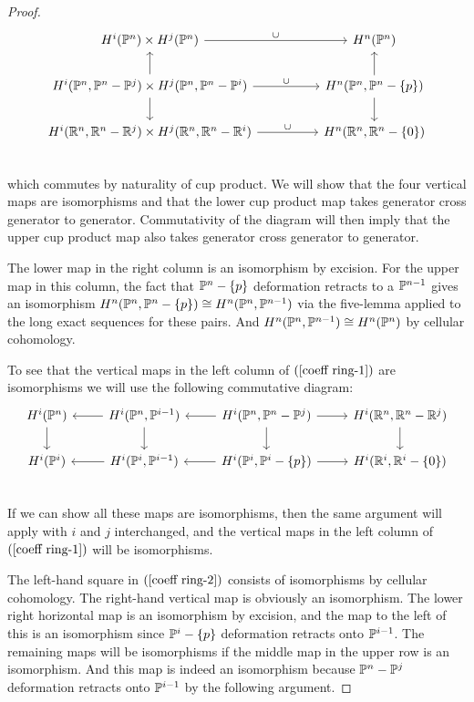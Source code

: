 \begin{proof}
\begin{equation}
\begin{tikzcd}
H^i(\P^n)\times H^j(\P^n)\ar[rr,"\cup"]&&H^n(\P^n)\\
H^i(\P^n,\P^n-\P^j)\times H^j(\P^n,\P^n-\P^i)\ar[rr,"\cup"]\ar[u]\ar[d]&&H^n(\P^n,\P^n-\{p\})\ar[u]\ar[d]\\
H^i(\R^n,\R^n-\R^j)\times H^j(\R^n,\R^n-\R^i)\ar[rr,"\cup"]&&H^n(\R^n,\R^n-\{0\})\\
\end{tikzcd}
\end{equation}
which commutes by naturality of cup product. We will show that the four vertical maps are isomorphisms and that the lower cup product map takes generator cross generator to generator. Commutativity of the diagram will then imply that the upper cup product map also takes generator cross generator to generator.\par
The lower map in the right column is an isomorphism by excision. For the upper
map in this column, the fact that $\P^n-\{p\}$ deformation retracts to a $\P^{n-1}$ gives an isomorphism $H^n(\P^n,\P^n-\{p\})\cong H^n(\P^n,\P^{n-1})$ via the five-lemma applied to the long exact sequences for these pairs. And $H^n(\P^n,\P^{n-1})\cong H^n(\P^n)$ by cellular cohomology.\par
To see that the vertical maps in the left column of $(\ref{coeff ring-1})$ are isomorphisms we will use the following commutative diagram:
\begin{equation}\label{coeff ring-2}
\begin{tikzcd}
H^i(\P^n)\ar[d]&H^i(\P^n,\P^{i-1})\ar[l]\ar[d]&H^i(\P^n,\P^n-\P^j)\ar[d]\ar[l]\ar[r]&H^i(\R^n,\R^n-\R^j)\ar[d]\\
H^i(\P^i)&H^i(\P^i,\P^{i-1})\ar[l]&H^i(\P^i,\P^i-\{p\})\ar[l]\ar[r]&H^i(\R^i,\R^i-\{0\})\\
\end{tikzcd}
\end{equation}
If we can show all these maps are isomorphisms, then the same argument will apply with $i$ and $j$ interchanged, and the vertical maps in the left column of $(\ref{coeff ring-1})$ will be isomorphisms.\par
The left-hand square in $(\ref{coeff ring-2})$ consists of isomorphisms by cellular cohomology. The right-hand vertical map is obviously an isomorphism. The lower right horizontal map is an isomorphism by excision, and the map to the left of this is an isomorphism since $\P^i-\{p\}$ deformation retracts onto $\P^{i-1}$. The remaining maps will be isomorphisms if the middle map in the upper row is an isomorphism. And this map is indeed an isomorphism because $\P^n-\P^j$ deformation retracts onto $\P^{i-1}$ by the following argument.\par

\end{proof}

